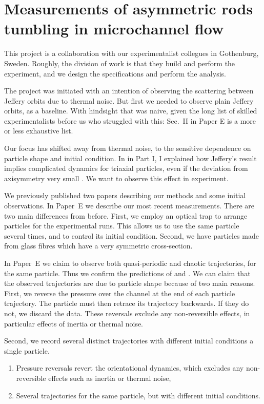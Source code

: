 \documentclass[thesis.tex]{subfiles}
\begin{document}
\chapter[Measurements of asymmetric rods]{Measurements of asymmetric rods tumbling in microchannel flow}

This project is a collaboration with our experimentalist collegues in Gothenburg, Sweden. Roughly, the division of work is that they build and perform the experiment, and we design the specifications and perform the analysis.

The project was initiated with an intention of observing the scattering between Jeffery orbits due to thermal noise. But first we needed to observe plain Jeffery orbits, as a baseline. With hindsight that was naive, given the long list of skilled experimentalists before us who struggled with this: Sec.~II in Paper E is a more or less exhaustive list. 

Our focus has shifted away from thermal noise, to the sensitive dependence on particle shape and initial condition. In  in Part I, I explained how Jeffery's result implies complicated dynamics for triaxial particles, even if the deviation from axisymmetry very small \cite{hinch1979,yarin1997}. We want to observe this effect in experiment.

We previously published two papers \cite{mishra2012,einarsson2013} describing our methods and some initial observations. In Paper~E we describe our most recent measurements. There are two main differences from before. First, we employ an optical trap to arrange particles for the experimental runs. This allows us to use the same particle several times, and to control its initial condition. Second, we have particles made from glass fibres which have a very symmetric cross-section.

In Paper~E we claim to observe both quasi-periodic and chaotic trajectories, for the same particle. Thus we confirm the predictions of \citet{hinch1979} and \citet{yarin1997}. We can claim that the observed trajectories are due to particle shape because of two main reasons. First, we reverse the pressure over the channel at the end of each particle trajectory. The particle must then retrace its trajectory backwards. If they do not, we discard the data. These reversals exclude any non-reversible effects, in particular effects of inertia or thermal noise.

Second, we record several distinct trajectories with different initial conditions a single particle.
\begin{enumerate}
    \item Pressure reversals revert the orientational dynamics, which excludes any non-reversible effects such as inertia or thermal noise,
    \item Several trajectories for the same particle, but with different initial conditions.
\end{enumerate}
\end{document}
